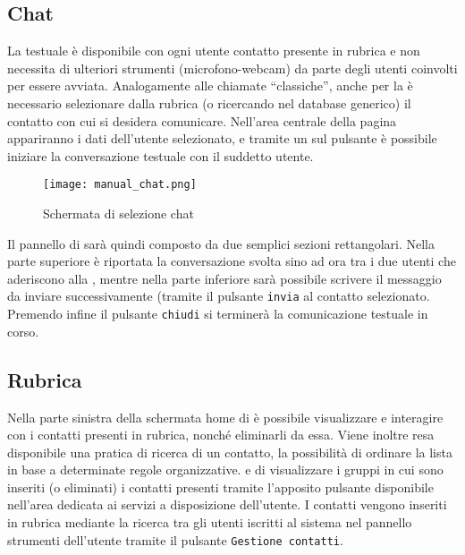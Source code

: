 
\subsection{Chat}
La  testuale è disponibile con ogni utente contatto presente in rubrica e non necessita di ulteriori strumenti (microfono-webcam) da parte degli utenti coinvolti per essere avviata. Analogamente alle chiamate ``classiche'', anche per la  è necessario selezionare dalla rubrica (o ricercando nel database generico)  il contatto con cui si desidera comunicare. Nell'area centrale della pagina appariranno i dati dell'utente selezionato, e tramite un  sul pulsante  è possibile iniziare la conversazione testuale con il suddetto utente.\\

\begin{figure}[H]
  \texttt{[image: manual\_chat.png]}
\caption{Schermata di selezione chat}\label{fig:chat}
\end{figure}

Il pannello di  sarà quindi composto da due semplici sezioni rettangolari. Nella parte superiore è riportata la conversazione svolta sino ad ora tra i due utenti che aderiscono alla , mentre nella parte inferiore sarà possibile scrivere il messaggio da inviare successivamente (tramite il pulsante \texttt{invia} al contatto selezionato.\\
Premendo infine il pulsante \texttt{chiudi} si terminerà la comunicazione testuale in corso.


\subsection{Rubrica}
Nella parte sinistra della schermata home di \caName{} è possibile visualizzare e interagire con i contatti presenti in rubrica, nonché eliminarli da essa. 
Viene inoltre resa disponibile una pratica  di ricerca di un contatto, la possibilità di ordinare la lista in base a determinate regole organizzative. e di visualizzare i gruppi in cui sono inseriti (o eliminati) i contatti presenti tramite l'apposito pulsante disponibile nell'area dedicata ai servizi a disposizione dell'utente.
I contatti vengono inseriti in rubrica mediante la ricerca tra gli utenti iscritti al sistema nel pannello strumenti dell'utente tramite il pulsante \texttt{Gestione contatti}.

